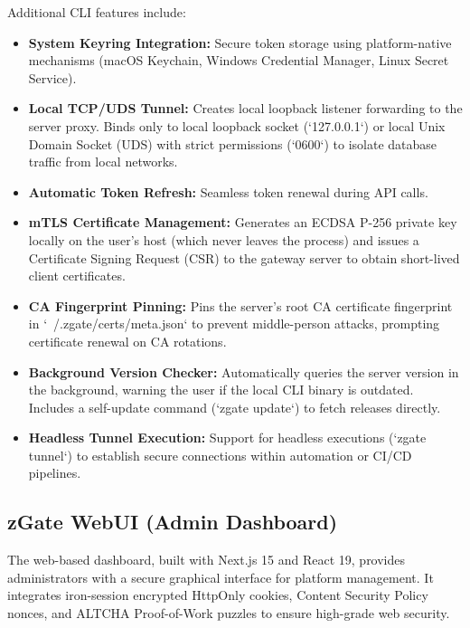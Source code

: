Additional CLI features include:
\begin{itemize}
    \item \textbf{System Keyring Integration:} Secure token storage using platform-native mechanisms (macOS Keychain, Windows Credential Manager, Linux Secret Service).
    \item \textbf{Local TCP/UDS Tunnel:} Creates local loopback listener forwarding to the server proxy. Binds only to local loopback socket (`127.0.0.1`) or local Unix Domain Socket (UDS) with strict permissions (`0600`) to isolate database traffic from local networks.
    \item \textbf{Automatic Token Refresh:} Seamless token renewal during API calls.
    \item \textbf{mTLS Certificate Management:} Generates an ECDSA P-256 private key locally on the user's host (which never leaves the process) and issues a Certificate Signing Request (CSR) to the gateway server to obtain short-lived client certificates.
    \item \textbf{CA Fingerprint Pinning:} Pins the server's root CA certificate fingerprint in `~/.zgate/certs/meta.json` to prevent middle-person attacks, prompting certificate renewal on CA rotations.
    \item \textbf{Background Version Checker:} Automatically queries the server version in the background, warning the user if the local CLI binary is outdated. Includes a self-update command (`zgate update`) to fetch releases directly.
    \item \textbf{Headless Tunnel Execution:} Support for headless executions (`zgate tunnel`) to establish secure connections within automation or CI/CD pipelines.
\end{itemize}


\subsection{zGate WebUI (Admin Dashboard)}

The web-based dashboard, built with Next.js 15 and React 19, provides administrators with a secure graphical interface for platform management. It integrates iron-session encrypted HttpOnly cookies, Content Security Policy nonces, and ALTCHA Proof-of-Work puzzles to ensure high-grade web security.

